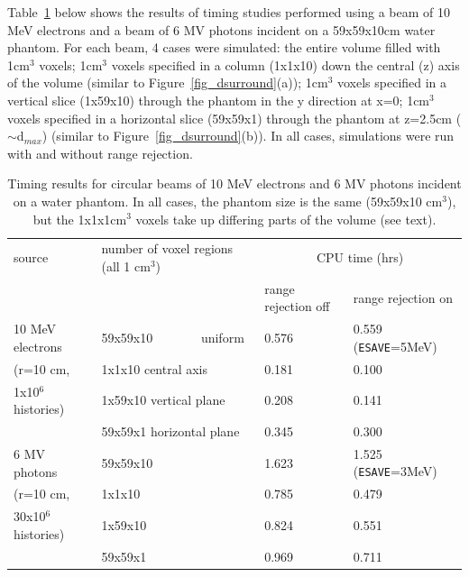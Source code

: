 \documentclass[12pt,twoside]{article}      %
\begin{document}

Table~\ref{dsurround_table} below shows the results of timing studies
performed using a beam of 10 MeV electrons and a beam
of 6 MV photons incident on a 59x59x10cm water phantom.  For
each beam, 4 cases were simulated: the entire volume filled with 1cm$^{3}$
voxels; 1cm$^{3}$ voxels specified in a column (1x1x10) down
the central (z) axis of the volume (similar to Figure~\ref{fig_dsurround}(a));
1cm$^{3}$ voxels specified in
a vertical slice (1x59x10) through the phantom in the y direction
at x=0; 1cm$^{3}$ voxels specified in a horizontal slice
(59x59x1) through the
phantom at z=2.5cm ($\sim$d$_{max}$)
(similar to Figure~\ref{fig_dsurround}(b)).  In
all cases, simulations were run with and without range rejection.

\begin{table}[htbp]
\caption{Timing results for circular beams of 10 MeV electrons and 6 MV
photons incident on a water phantom.
In all cases, the phantom size is the same (59x59x10 cm$^3$), but the
1x1x1cm$^3$ voxels take up differing parts of the volume (see text).}
\label{dsurround_table}
\begin{tabular}{|p{3cm}|p{3cm}|p{4cm}|p{4cm}|}
\hline
source & number of voxel regions (all 1 cm$^3$) & \multicolumn{2}{|c|}{CPU time (hrs)}\\
\cline{3-4}
       &             & range rejection off & range rejection on \\
\hline
\hline
10 MeV electrons & 59x59x10~~~~~~~ uniform & 0.576 & 0.559 ({\tt ESAVE}=5MeV)\\
\cline{2-4}
(r=10 cm, & 1x1x10 central axis & 0.181 & 0.100 \\
\cline{2-4}
1x10$^{6}$ histories) & 1x59x10 vertical plane & 0.208 & 0.141\\
\cline{2-4}
 & 59x59x1 horizontal plane & 0.345 & 0.300\\
\hline
\hline
6 MV photons & 59x59x10 & 1.623 & 1.525 ({\tt ESAVE}=3MeV)\\
\cline{2-4}
(r=10 cm, & 1x1x10 & 0.785 & 0.479\\
\cline{2-4}
30x10$^{6}$ histories) & 1x59x10 & 0.824 & 0.551\\
\cline{2-4}
 & 59x59x1 & 0.969 & 0.711\\
\hline
\end{tabular}
\end{table}
\end{document}
